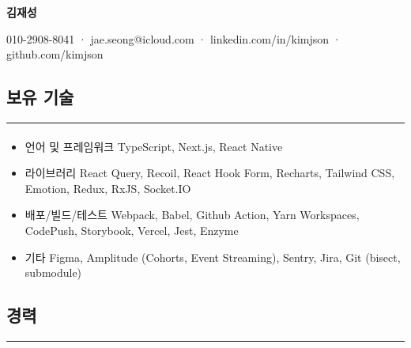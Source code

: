 \documentclass{article}
\begin{document}
\begin{center}
    \huge\textbf{김재성}
\end{center}

\begin{center}
    010-2908-8041 · jae.seong@icloud.com · linkedin.com/in/kimjson · github.com/kimjson
\end{center}

\begin{center}
    \section*{보유 기술}
\end{center}
\hrule
\paragraph{}
\begin{itemize}
    \setlength\itemsep{0.1em}
    \item 언어 및 프레임워크 \hspace{1em} TypeScript, Next.js, React Native
    \item 라이브러리 \hspace{4.1em} React Query, Recoil, React Hook Form, Recharts, Tailwind CSS, Emotion, Redux, RxJS, Socket.IO
    \item 배포/빌드/테스트 \hspace{1.3em} Webpack, Babel, Github Action, Yarn Workspaces, CodePush, Storybook, Vercel, Jest, Enzyme
    \item 기타 \hspace{6.7em} Figma, Amplitude (Cohorts, Event Streaming), Sentry, Jira, Git (bisect, submodule)
\end{itemize}

\begin{center}
    \section*{경력}
\end{center}
\hrule
\end{document}
